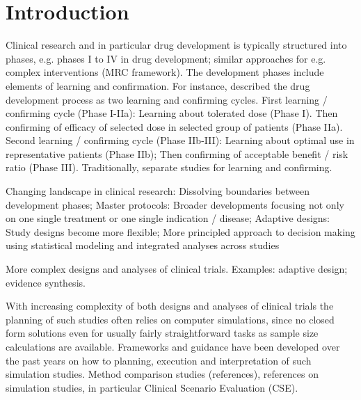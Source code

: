 \documentclass[bimj,fleqn]{w-art}
\theoremstyle{plain}
\theoremstyle{definition}
\begin{document}
\maketitle                   %







\section{Introduction}

Clinical research and in particular drug development is typically structured into phases, e.g. phases I to IV in drug development; similar approaches for e.g. complex interventions (MRC framework). 
The development phases include elements of learning and confirmation. 
For instance, \citet{sheiner_learning_1997} described the drug development process as two learning and confirming cycles. 
First learning / confirming cycle (Phase I-IIa): Learning about tolerated dose (Phase I). 
Then confirming of efficacy of selected dose in selected group of patients (Phase IIa). 
Second learning / confirming cycle (Phase IIb-III): Learning about optimal use in representative patients (Phase IIb); Then confirming of acceptable benefit / risk ratio (Phase III). 
Traditionally, separate studies for learning and confirming.  

Changing landscape in clinical research: Dissolving boundaries between development phases; Master protocols: Broader developments focusing not only on one single treatment or one single indication / disease; Adaptive designs: Study designs become more flexible; More principled approach to decision making using statistical modeling and integrated analyses across studies

More complex designs and analyses of clinical trials. 
Examples: adaptive design; evidence synthesis.

With increasing complexity of both designs and analyses of clinical trials the planning of such studies often relies on computer simulations, since no closed form solutions even for usually fairly straightforward tasks as sample size calculations are available. 
Frameworks and guidance have been developed over the past years on how to planning, execution and interpretation of such simulation studies. 
Method comparison studies (references), references on simulation studies, in particular Clinical Scenario Evaluation (CSE).
\end{document}
